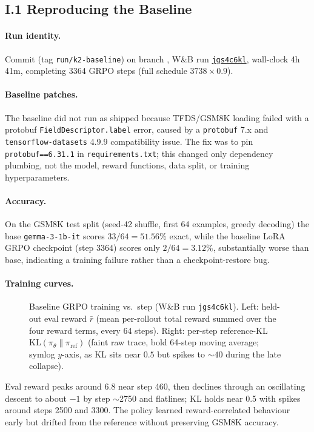 \subsection{I.1 Reproducing the Baseline}

\paragraph{Run identity.}
Commit  (tag \texttt{run/k2-baseline}) on branch , W\&B run
\href{https://wandb.ai/felsomoye-university-of-cambridge/tunix/runs/jgs4c6kl}{\texttt{jgs4c6kl}},
wall-clock 4h\,41m, completing 3364 GRPO steps (full schedule $3738\times0.9$).

\paragraph{Baseline patches.}
The baseline did not run as shipped because TFDS/GSM8K loading failed with a protobuf \texttt{FieldDescriptor.label} error, caused by a \texttt{protobuf} 7.x and \texttt{tensorflow-datasets} 4.9.9 compatibility issue. The fix was to pin \texttt{protobuf==6.31.1} in \texttt{requirements.txt}; this changed only dependency plumbing, not the model, reward functions, data split, or training hyperparameters.

\paragraph{Accuracy.}
On the GSM8K test split (seed-42 shuffle, first 64 examples, greedy decoding) the base
\texttt{gemma-3-1b-it} scores $33/64=51.56\%$ exact, while the baseline LoRA GRPO checkpoint
(step 3364) scores only $2/64=3.12\%$, substantially worse than base, indicating a training
failure rather than a checkpoint-restore bug.

\paragraph{Training curves.}
\begin{figure}[htbp]
\centering
{}
\caption{Baseline GRPO training vs.\ step (W\&B run \texttt{jgs4c6kl}). Left: held-out eval reward
$\bar r$ (mean per-rollout total reward summed over the four reward terms, every 64 steps). Right:
per-step reference-KL $\mathrm{KL}(\pi_\theta\|\pi_{\mathrm{ref}})$ (faint raw trace, bold 64-step
moving average; symlog $y$-axis, as KL sits near $0.5$ but spikes to ${\sim}40$ during the late
collapse).}
\label{fig:baseline-curves}
\end{figure}

\noindent
Eval reward peaks around 6.8 near step 460, then declines through an oscillating descent to
about $-1$ by step $\sim$2750 and flatlines; KL holds near 0.5 with spikes around steps 2500
and 3300. The policy learned reward-correlated behaviour early but drifted from the reference
without preserving GSM8K accuracy.
